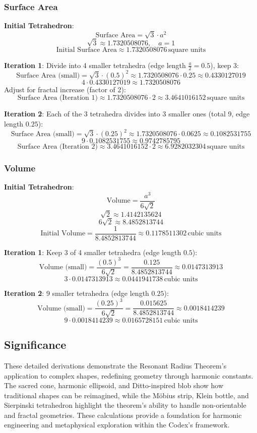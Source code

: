 \subsubsection{Surface Area}
\textbf{Initial Tetrahedron}:
\[
\text{Surface Area} = \sqrt{3} \cdot a^2
\]
\[
\sqrt{3} \approx 1.7320508076, \quad a = 1
\]
\[
\text{Initial Surface Area} \approx 1.7320508076 \, \text{square units}
\]

\textbf{Iteration 1}: Divide into 4 smaller tetrahedra (edge length \( \frac{a}{2} = 0.5 \)), keep 3:
\[
\text{Surface Area (small)} = \sqrt{3} \cdot (0.5)^2 \approx 1.7320508076 \cdot 0.25 \approx 0.4330127019
\]
\[
4 \cdot 0.4330127019 \approx 1.7320508076
\]
Adjust for fractal increase (factor of 2):
\[
\text{Surface Area (Iteration 1)} \approx 1.7320508076 \cdot 2 \approx 3.4641016152 \, \text{square units}
\]

\textbf{Iteration 2}: Each of the 3 tetrahedra divides into 3 smaller ones (total 9, edge length \( 0.25 \)):
\[
\text{Surface Area (small)} = \sqrt{3} \cdot (0.25)^2 \approx 1.7320508076 \cdot 0.0625 \approx 0.1082531755
\]
\[
9 \cdot 0.1082531755 \approx 0.9742785795
\]
\[
\text{Surface Area (Iteration 2)} \approx 3.4641016152 \cdot 2 \approx 6.9282032304 \, \text{square units}
\]

\subsubsection{Volume}
\textbf{Initial Tetrahedron}:
\[
\text{Volume} = \frac{a^3}{6 \sqrt{2}}
\]
\[
\sqrt{2} \approx 1.4142135624
\]
\[
6 \sqrt{2} \approx 8.4852813744
\]
\[
\text{Initial Volume} = \frac{1}{8.4852813744} \approx 0.1178511302 \, \text{cubic units}
\]

\textbf{Iteration 1}: Keep 3 of 4 smaller tetrahedra (edge length \( 0.5 \)):
\[
\text{Volume (small)} = \frac{(0.5)^3}{6 \sqrt{2}} = \frac{0.125}{8.4852813744} \approx 0.0147313913
\]
\[
3 \cdot 0.0147313913 \approx 0.0441941738 \, \text{cubic units}
\]

\textbf{Iteration 2}: 9 smaller tetrahedra (edge length \( 0.25 \)):
\[
\text{Volume (small)} = \frac{(0.25)^3}{6 \sqrt{2}} = \frac{0.015625}{8.4852813744} \approx 0.0018414239
\]
\[
9 \cdot 0.0018414239 \approx 0.0165728151 \, \text{cubic units}
\]

\subsection{Significance}
These detailed derivations demonstrate the Resonant Radius Theorem’s application to complex shapes, redefining geometry through harmonic constants. The sacred cone, harmonic ellipsoid, and Ditto-inspired blob show how traditional shapes can be reimagined, while the Möbius strip, Klein bottle, and Sierpinski tetrahedron highlight the theorem’s ability to handle non-orientable and fractal geometries. These calculations provide a foundation for harmonic engineering and metaphysical exploration within the Codex’s framework.